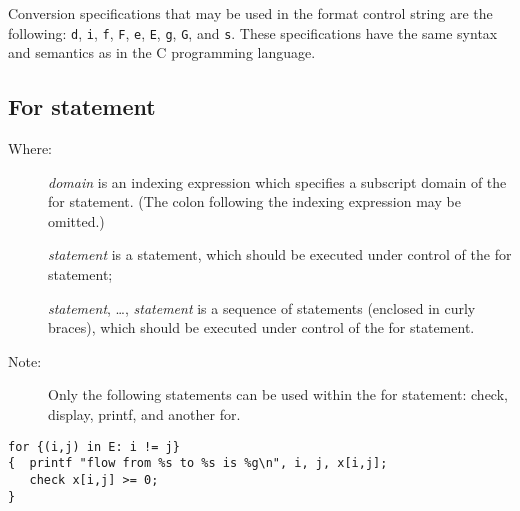 \documentclass[10pt]{article}
\begin{document}
Conversion specifications that may be used in the format control string
are the following: {\tt d}, {\tt i}, {\tt f}, {\tt F}, {\tt e}, {\tt E},
{\tt g}, {\tt G}, and {\tt s}. These specifications have the same
syntax and semantics as in the C programming language.

\subsection{For statement}

\medskip


\setlength{\leftmargini}{60pt}

\begin{description}
\item[{\rm Where:}\hspace*{23pt}] {\it domain} is an indexing
expression which specifies a subscript domain of the for statement.
(The colon following the indexing expression may be omitted.)
\item[\hspace*{54pt}] {\it statement} is a statement, which should be
executed under control of the for statement;
\item[\hspace*{54pt}] {\it statement}, \dots, {\it statement} is a
sequence of statements (enclosed in curly braces), which should be
executed under control of the for statement.
\end{description}

\begin{description}
\item[{\rm Note:}\hspace*{31pt}] Only the following statements can be
used within the for statement: check, display, printf, and another for.
\end{description}


\begin{verbatim}
for {(i,j) in E: i != j}
{  printf "flow from %s to %s is %g\n", i, j, x[i,j];
   check x[i,j] >= 0;
}
\end{verbatim}
\end{document}
